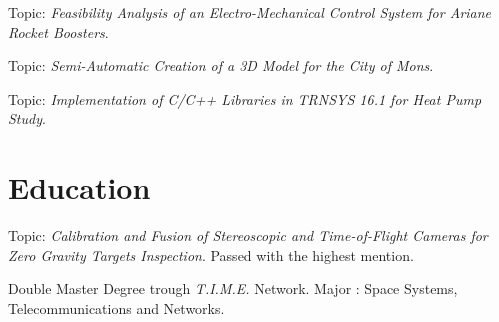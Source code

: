 \documentclass[a4paper]{deedy-resume} %
\begin{document}
{
Topic: \textit{Feasibility Analysis of an Electro-Mechanical Control System for Ariane Rocket Boosters}.

\vspace{9pt}

Topic: \textit{Semi-Automatic Creation of a 3D Model for the City of Mons}.

\vspace{9pt}

Topic: \textit{Implementation of C/C++ Libraries in TRNSYS 16.1 for Heat Pump Study}.

\vspace{14pt}


\section{Education}
\vspace{5pt}

\vspace{2pt}
Topic: \textit{Calibration and Fusion of Stereoscopic and Time-of-Flight Cameras for Zero Gravity Targets Inspection}. Passed with the highest mention.

\vspace{9pt}

\vspace{2pt}
Double Master Degree trough \textit{T.I.M.E.} Network. Major : Space Systems, Telecommunications and Networks.

\vspace{9pt}

}
\end{document}
